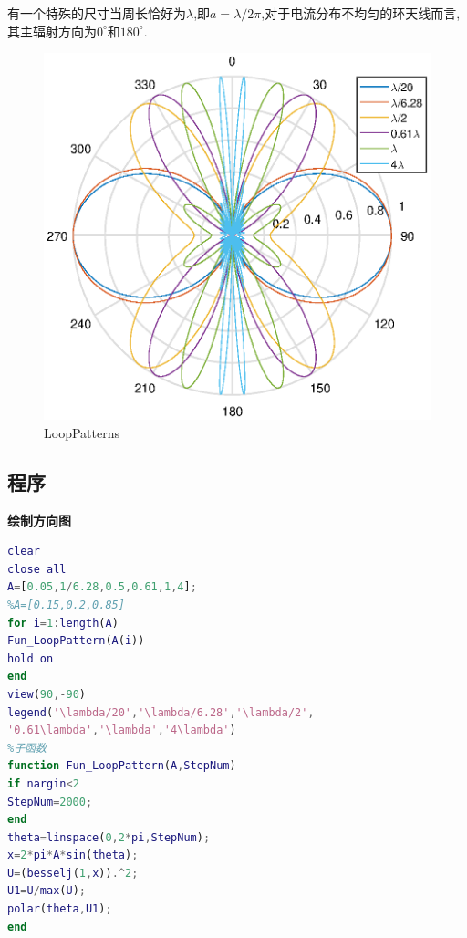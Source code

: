 有一个特殊的尺寸当周长恰好为$\lambda$,即$a=\lambda/2\pi$,对于电流分布不均匀的环天线而言,其主辐射方向为$0^\circ $和$180^\circ $.
\begin{figure}[!ht]
	\centering
	\includegraphics[width=12cm]{loop_all.eps}
	\caption{LoopPatterns} \label{fig:loopall}
\end{figure}

\subsection{程序}
\noindent \textbf{绘制方向图}
\begin{lstlisting}[language={matlab},keywordstyle=\color{blue!70},commentstyle=\color{red!50!green!50!blue!50},frame=shadowbox, rulesepcolor=\color{red!20!green!20!blue!20}] 
%主程序
clear
close all
A=[0.05,1/6.28,0.5,0.61,1,4];
%A=[0.15,0.2,0.85]
for i=1:length(A)
Fun_LoopPattern(A(i))
hold on
end
view(90,-90)
legend('\lambda/20','\lambda/6.28','\lambda/2',
'0.61\lambda','\lambda','4\lambda')
%子函数
function Fun_LoopPattern(A,StepNum)
if nargin<2
StepNum=2000;
end
theta=linspace(0,2*pi,StepNum);
x=2*pi*A*sin(theta);
U=(besselj(1,x)).^2;
U1=U/max(U);
polar(theta,U1);
end

\end{lstlisting}

